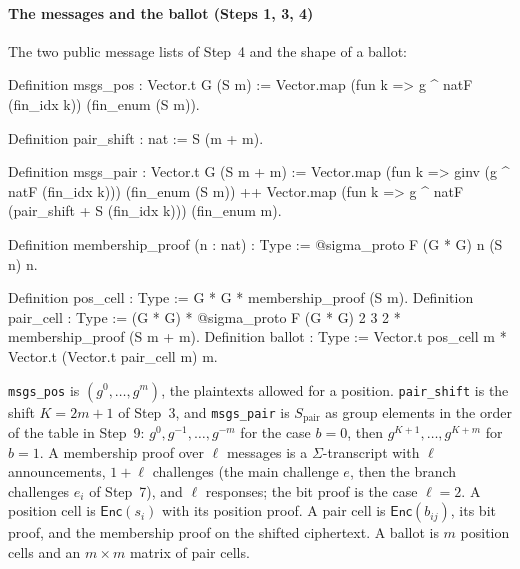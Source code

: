 \documentclass[11pt,a4paper]{article}
\newcommand{\Enc}{\mathsf{Enc}}
\newcommand{\rocq}[1]{\texttt{#1}}
\theoremstyle{remark}
\begin{document}
\paragraph{The messages and the ballot (Steps 1, 3, 4)} The two public
message lists of Step~4 and the shape of a ballot:
\begin{coq}
Definition msgs_pos : Vector.t G (S m) :=
  Vector.map (fun k => g ^ natF (fin_idx k)) (fin_enum (S m)).

Definition pair_shift : nat := S (m + m).

Definition msgs_pair : Vector.t G (S m + m) :=
  Vector.map (fun k => ginv (g ^ natF (fin_idx k))) (fin_enum (S m)) ++
  Vector.map (fun k => g ^ natF (pair_shift + S (fin_idx k))) (fin_enum m).

Definition membership_proof (n : nat) : Type :=
  @sigma_proto F (G * G) n (S n) n.

Definition pos_cell : Type := G * G * membership_proof (S m).
Definition pair_cell : Type :=
  (G * G) * @sigma_proto F (G * G) 2 3 2 * membership_proof (S m + m).
Definition ballot : Type :=
  Vector.t pos_cell m * Vector.t (Vector.t pair_cell m) m.
\end{coq}
\rocq{msgs\_pos} is $(g^{0}, \ldots, g^{m})$, the plaintexts allowed
for a position. \rocq{pair\_shift} is the shift $K = 2m + 1$ of Step~3,
and \rocq{msgs\_pair} is $S_{\mathrm{pair}}$ as group elements in the
order of the table in Step~9: $g^{0}, g^{-1}, \ldots, g^{-m}$ for the case
$b = 0$, then $g^{K+1}, \ldots, g^{K+m}$ for $b = 1$. A membership proof
over $\ell$ messages is a $\Sigma$-transcript with $\ell$ announcements,
$1 + \ell$ challenges (the main challenge $e$, then the branch challenges
$e_i$ of Step~7), and $\ell$ responses; the bit proof is the case $\ell =
2$. A position cell is $\Enc(s_i)$ with its position proof. A pair cell is
$\Enc(b_{ij})$, its bit proof, and the membership proof on the shifted
ciphertext. A ballot is $m$ position cells and an $m \times m$ matrix of
pair cells.
\end{document}
